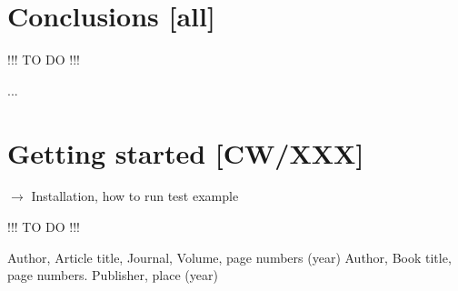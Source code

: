 \section{Conclusions {\bf [all]} }
\label{conc}
\smallskip
{\color{red} !!! TO DO !!!}
\smallskip




\begin{acknowledgements}
...
\end{acknowledgements}



\appendix
\label{}

\section{Getting started  {\bf [CW/XXX]}}
\label{code_init}

$\to$ Installation, how to run test example

\smallskip
{\color{red} !!! TO DO !!!}
\smallskip



\begin{thebibliography}{}
%
%
Author, Article title, Journal, Volume, page numbers (year)
Author, Book title, page numbers. Publisher, place (year)
\end{thebibliography}




